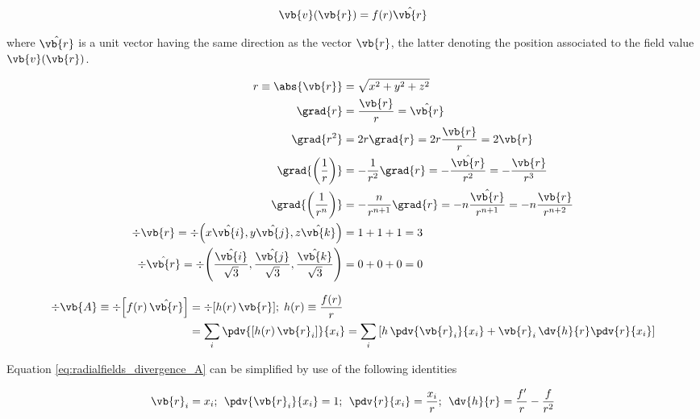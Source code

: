 \begin{equation*}
\vb{v}(\vb{r}) = f(r) \hat{\vb{r}} 
\end{equation*}

where $\hat{\vb{r}}$  is a unit vector having the same direction as the vector $\vb{r}$, the latter denoting the position associated to the field value $\vb{v}(\vb{r})$.

\begin{subequations}
\label{eq:radialfields_A}
\begin{align} 
r \equiv \abs{\vb{r}} &= \sqrt{x^2 + y^2 + z^2}
\label{eq:radialfields_1} \\
\grad{r} &= \frac{\vb{r}}{r} = \hat{\vb{r}}
\label{eq:radialfields_2} \\
\grad{r^2} &= 2 r \grad{r} = 2r \frac{\vb{r}}{r} = 2 \vb{r}
\label{eq:radialfields_3} \\
\grad{\left( \frac{1}{r} \right)} &= - \frac{1}{r^2} \grad{r} = - \frac{\hat{\vb{r}}}{r^2} = - \frac{\vb{r}}{r^3}  
\label{eq:radialfields_4} \\
\grad{\left( \frac{1}{r^n} \right)} &= - \frac{n}{r^{n+1}} \grad{r} = - n \frac{\hat{\vb{r}}}{r^{n+1}} = - n \frac{\vb{r}}{r^{n+2}}
\label{eq:radialfields_5} \\
\div{\vb{r}}  = \div{\left( x \hat{\vb{i}}, y \hat{\vb{j}}, z \hat{\vb{k}} \right)} &= 1 + 1 + 1 = 3
\label{eq:radialfields_6} \\
\div{\hat{\vb{r}}}  = \div{\left(\frac{\hat{\vb{i}}}{\sqrt{3}}, \frac{\hat{\vb{j}}}{\sqrt{3}}, \frac{\hat{\vb{k}}}{\sqrt{3}} \right)}  &= 0 + 0 + 0 = 0
\label{eq:radialfields_7}
\end{align}
\end{subequations}

\begin{equation}
\begin{aligned} 
\div{\vb{A}} \equiv \div{\left[ f(r) \, \hat{\vb{r}} \right]} &= \div{\left[ h(r) \, \vb{r} \right]}; \; h(r) \equiv \frac{f(r)}{r}\\
&= \sum\limits_i{ \pdv{{\left[ h(r) \, \vb{r}_i \right]}}{x_i} } 
 = \sum\limits_i{ \left[ h \, \pdv{\vb{r}_i}{x_i} + \vb{r}_i \, \dv{h}{r} \pdv{r}{x_i} \right]}
\label{eq:radialfields_divergence_A}
\end{aligned}
\end{equation}

Equation \ref{eq:radialfields_divergence_A} can be simplified by use of the following identities 

\begin{equation*}
\vb{r}_i = x_i ; \:\: \pdv{\vb{r}_i}{x_i} = 1 ;  \:\: \pdv{r}{x_i} = \frac{x_i}{r};  \:\: \dv{h}{r} = \frac{f'}{r}
- \frac{f}{r^2}
\end{equation*}

